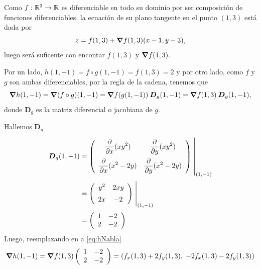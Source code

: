 \newpage
\begin{solution}

    Como   $f:\mathbb{R}^2\to\mathbb{R}$ es diferenciable en todo su dominio por ser composición de funciones diferenciables,  la ecuaci\'on de su plano tangente en el punto $(1,3)$ est\'a dada por
    \begin{equation}
        z= f(1,3) + \grad f(1,3) (x-1,y-3),  \label{eq:zNabla}
    \end{equation}   luego ser\'a  suficente con encontar $ f(1,3)$ y $\grad f(1,3).$

    Por un lado,      $h(1,-1)= f\circ g (1,-1) =  f(1,3)=2$  y por otro lado,  como $f$ y $g$ son ambas diferenciables,  por la regla de la cadena,  tenemos que
    \begin{equation}
        \grad h(1,-1)=\grad (f\circ g)(1,-1)=\grad f(g(1,-1)) \:\boldsymbol{D}_g(1,-1) = \grad f (1,3) \:\boldsymbol{D}_g(1,-1),  \label{eq:hNabla}
    \end{equation}    donde $\boldsymbol{D}_g$ es la matriz diferencial o  jacobiana de $g$.

    \noindent  Hallemos $\boldsymbol{D}_g$
    \begin{align*}
        \boldsymbol{D}_g(1,-1) & =
        \left(\begin{array}{cc}
                      \displaystyle\partialx (xy^2)            & \displaystyle\partialy (xy^2)           \\[10pt]
                      \displaystyle\partialx  (x^2 -2y) & \displaystyle\partialy (x^2 -2y)
                  \end{array}\right)\left.\rule{0pt}{1.1cm}\right\rvert_{(1,-1)}             \\[2pt]
                              & =\left(\begin{array}{cc}
                                               \displaystyle y^2                 & \displaystyle 2xy              \\[5pt]
                                               \displaystyle   2x & \displaystyle -2
                                           \end{array}\right)\left.\rule{0pt}{0.7cm}\right\rvert_{(1,-1)} \\[2pt]
                              & =\left(\begin{array}{cc}
                                               1    & -2    \\
                                               2 & -2
                                           \end{array}\right)
    \end{align*}
    Luego, reemplazando en  a   \eqref{eq:hNabla}
    \[
        \grad h(1,-1) = \grad f(1,3)\left(\begin{array}{cc}
                1   & -2    \\
                2 & -2
            \end{array}\right) = \left(f_x(1,3) + 2f_y(1,3),\;-2f_x(1,3)-2f_y(1,3)\right)
    \]


\end{solution}
